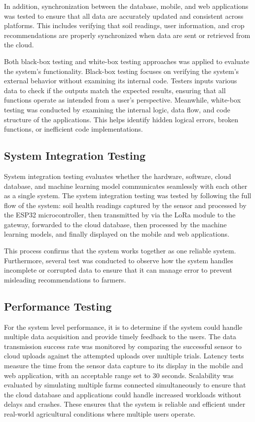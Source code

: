 {	In addition, synchronization between the database, mobile, and web applications was tested to ensure that all data are accurately updated and consistent across platforms. This includes verifying that soil readings, user information, and crop recommendations are properly synchronized when data are sent or retrieved from the cloud.
	
	Both black-box testing and white-box testing approaches was applied to evaluate the system’s functionality. Black-box testing focuses on verifying the system’s external behavior without examining its internal code. Testers inputs various data to check if the outputs match the expected results, ensuring that all functions operate as intended from a user’s perspective. Meanwhile, white-box testing was conducted by examining the internal logic, data flow, and code structure of the applications. This helps identify hidden logical errors, broken functions, or inefficient code implementations.
	
	\subsection{System Integration Testing}
	System integration testing evaluates whether the hardware, software, cloud database, and machine learning model communicates seamlessly with each other as a single system. The system integration testing was tested by following the full flow of the system: soil health readings captured by the sensor and processed by the ESP32 microcontroller, then transmitted by via the LoRa module to the gateway, forwarded to the cloud database, then processed by the machine learning models, and finally displayed on the mobile and web applications. 
	
	This process confirms that the system works together as one reliable system. Furthermore, several test was conducted to observe how the system handles incomplete or corrupted data to ensure that it can manage error to prevent misleading recommendations to farmers.
	
	\subsection{Performance Testing}
	For the system level performance, it is to determine if the system could handle multiple data acquisition and provide timely feedback to the users. The data transmission success rate was monitored by comparing the successful sensor to cloud uploads against the attempted uploads over multiple trials. Latency tests measure the time from the sensor data capture to its display in the mobile and web application, with an acceptable range set to 30 seconds. Scalability was evaluated by simulating multiple farms connected simultaneously to ensure that the cloud database and applications could handle increased workloads without delays and crashes. These ensures that the system is reliable and efficient under real-world agricultural conditions where multiple users operate.
	
}
